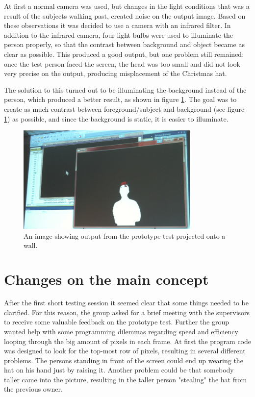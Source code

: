At first a normal camera was used, but changes in the light conditions that was a result of the subjects walking past, created noise on the output image. Based on these observations it was decided to use a camera with an infrared filter. In addition to the infrared camera, four light bulbs were used to illuminate the person properly, so that the contrast between background and object became as clear as possible. This produced a good output, but one problem still remained: once the test person faced the screen, the head was too small and did not look very precise on the output, producing misplacement of the Christmas hat.

The solution to this turned out to be illuminating the background instead of the person, which produced a better result, as shown in figure \ref{fig:max_subtracted}. The goal was to create as much contrast between foreground/subject and background (see figure \ref{fig:max_subtracted}) as possible, and since the background is static, it is easier to illuminate.

\begin{figure}[htbp]
\centering
\includegraphics[width=0.80\textwidth]{Pictures/Test/MaxSubtracted.jpg}
\caption{An image showing output from the prototype test projected onto a wall.}
\label{fig:max_subtracted}
\end{figure}

\section{Changes on the main concept}
After the first short testing session it seemed clear that some things needed to be clarified. For this reason, the group asked for a brief meeting with the supervisors to receive some valuable feedback on the prototype test. Further the group wanted help with some programming dilemmas regarding speed and efficiency looping through the big amount of pixels in each frame. At first the program code was designed to look for the top-most row of pixels, resulting in several different problems. The persons standing in front of the screen could end up wearing the hat on his hand just by raising it. Another problem could be that somebody taller came into the picture, resulting in the taller person "stealing" the hat from the previous owner.

